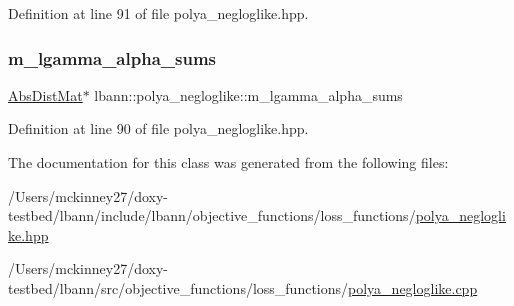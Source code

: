 Definition at line 91 of file polya\+\_\+negloglike.\+hpp.

\mbox{\label{classlbann_1_1polya__negloglike_a0aec768ffa50a8b716149d597699eddb}} 
\subsubsection{\texorpdfstring{m\+\_\+lgamma\+\_\+alpha\+\_\+sums}{m\_lgamma\_alpha\_sums}}
{\footnotesize\ttfamily \hyperlink{base_8hpp_a9a697a504ae84010e7439ffec862b470}{Abs\+Dist\+Mat}$\ast$ lbann\+::polya\+\_\+negloglike\+::m\+\_\+lgamma\+\_\+alpha\+\_\+sums\hspace{0.3cm}{\ttfamily [private]}}



Definition at line 90 of file polya\+\_\+negloglike.\+hpp.



The documentation for this class was generated from the following files\+:\begin{DoxyCompactItemize}
\item 
/\+Users/mckinney27/doxy-\/testbed/lbann/include/lbann/objective\+\_\+functions/loss\+\_\+functions/\hyperlink{polya__negloglike_8hpp}{polya\+\_\+negloglike.\+hpp}\item 
/\+Users/mckinney27/doxy-\/testbed/lbann/src/objective\+\_\+functions/loss\+\_\+functions/\hyperlink{polya__negloglike_8cpp}{polya\+\_\+negloglike.\+cpp}\end{DoxyCompactItemize}
